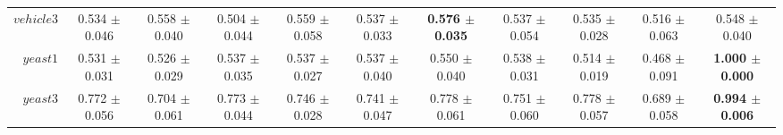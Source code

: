 \begin{table}[!ht]
{\begin{tabular}{r c c c c c c c c c c}
$vehicle3$ & 0.534 $\pm$ 0.046 & 0.558 $\pm$ 0.040 & 0.504 $\pm$ 0.044 & 0.559 $\pm$ 0.058 & 0.537 $\pm$ 0.033 & \textbf{0.576 $\pm$ 0.035} & 0.537 $\pm$ 0.054 & 0.535 $\pm$ 0.028 & 0.516 $\pm$ 0.063 & 0.548 $\pm$ 0.040 \\
$yeast1$ & 0.531 $\pm$ 0.031 & 0.526 $\pm$ 0.029 & 0.537 $\pm$ 0.035 & 0.537 $\pm$ 0.027 & 0.537 $\pm$ 0.040 & 0.550 $\pm$ 0.040 & 0.538 $\pm$ 0.031 & 0.514 $\pm$ 0.019 & 0.468 $\pm$ 0.091 & \textbf{1.000 $\pm$ 0.000} \\
$yeast3$ & 0.772 $\pm$ 0.056 & 0.704 $\pm$ 0.061 & 0.773 $\pm$ 0.044 & 0.746 $\pm$ 0.028 & 0.741 $\pm$ 0.047 & 0.778 $\pm$ 0.061 & 0.751 $\pm$ 0.060 & 0.778 $\pm$ 0.057 & 0.689 $\pm$ 0.058 & \textbf{0.994 $\pm$ 0.006} \\
\end{tabular}}
\end{table}
